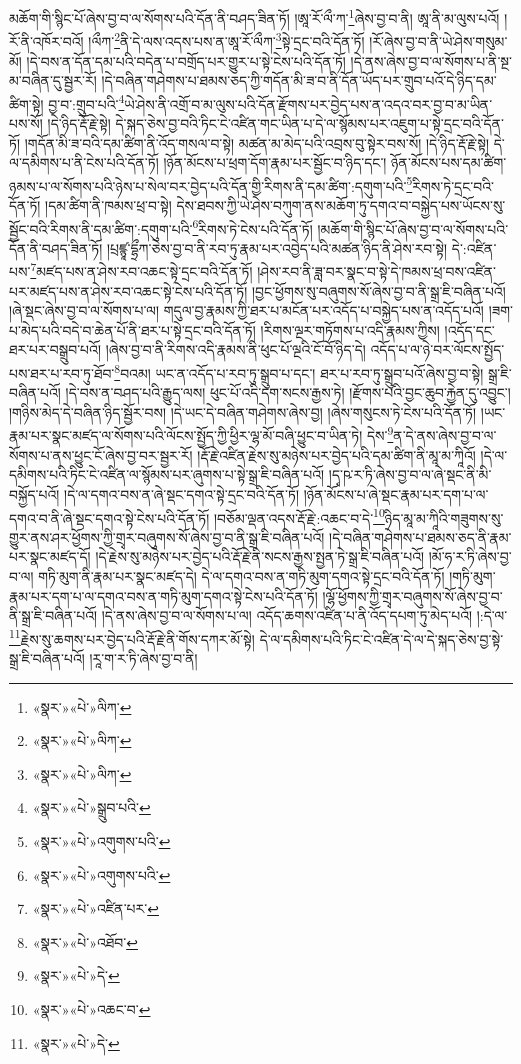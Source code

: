 མཆོག་གི་སྙིང་པོ་ཞེས་བྱ་བ་ལ་སོགས་པའི་དོན་ནི་བཤད་ཟིན་ཏོ། །ཨཱ་རོ་ལྀ་ཀ་\footnote{«སྣར་»«པེ་»ལིཀ་}ཞེས་བྱ་བ་ནི། ཨཱ་ནི་མ་ལུས་པའོ། །རོ་ནི་འཁོར་བའོ། །ལྀཀ་\footnote{«སྣར་»«པེ་»ལིཀ་}ནི་དེ་ལས་འདས་པས་ན་ཨཱ་རོ་ལྀཀ་\footnote{«སྣར་»«པེ་»ལིཀ་}སྟེ་དྲང་བའི་དོན་ཏོ། །རོ་ཞེས་བྱ་བ་ནི་ཡེ་ཤེས་གསུམ་མོ། །དེ་བས་ན་དོན་དམ་པའི་བདེན་པ་བགྲོད་པར་གྱུར་པ་སྟེ་ངེས་པའི་དོན་ཏོ། །དེ་ནས་ཞེས་བྱ་བ་ལ་སོགས་པ་ནི་སྔ་མ་བཞིན་དུ་སྦྱར་རོ། །དེ་བཞིན་གཤེགས་པ་ཐམས་ཅད་ཀྱི་གདོན་མི་ཟ་བ་ནི་དོན་ཡོད་པར་གྲུབ་པའོ་དེ་ཉིད་དམ་ཚིག་སྟེ། བྱ་བ་:གྲུབ་པའི་\footnote{«སྣར་»«པེ་»སྒྲུབ་པའི་}ཡེ་ཤེས་ནི་འགྲོ་བ་མ་ལུས་པའི་དོན་རྫོགས་པར་བྱེད་པས་ན་འདའ་བར་བྱ་བ་མ་ཡིན་པས་སོ། །དེ་ཉིད་རྡོ་རྗེ་སྟེ། དེ་སྐད་ཅེས་བྱ་བའི་ཏིང་ངེ་འཛིན་གང་ཡིན་པ་དེ་ལ་སྙོམས་པར་འཇུག་པ་སྟེ་དྲང་བའི་དོན་ཏོ། །གདོན་མི་ཟ་བའི་དམ་ཚིག་ནི་འོད་གསལ་བ་སྟེ། མཚན་མ་མེད་པའི་འབྲས་བུ་སྟེར་བས་སོ། །དེ་ཉིད་རྡོ་རྗེ་སྟེ། དེ་ལ་དམིགས་པ་ནི་ངེས་པའི་དོན་ཏོ། །ཉོན་མོངས་པ་ཕྲག་དོག་རྣམ་པར་སྦྱོང་བ་ཉིད་དང་། ཉོན་མོངས་པས་དམ་ཚིག་ཉམས་པ་ལ་སོགས་པའི་ཉེས་པ་སེལ་བར་བྱེད་པའི་དོན་གྱི་རིགས་ནི་དམ་ཚིག་:དགུག་པའི་\footnote{«སྣར་»«པེ་»འགུགས་པའི་}རིགས་ཏེ་དྲང་བའི་དོན་ཏོ། །དམ་ཚིག་ནི་ཁམས་ཕྲ་བ་སྟེ། དེས་ཐབས་ཀྱི་ཡེ་ཤེས་བཀུག་ནས་མཆོག་ཏུ་དགའ་བ་བསྐྱེད་པས་ཡོངས་སུ་སྦྱོང་བའི་རིགས་ནི་དམ་ཚིག་:དགུག་པའི་\footnote{«སྣར་»«པེ་»འགུགས་པའི་}རིགས་ཏེ་ངེས་པའི་དོན་ཏོ། །མཆོག་གི་སྙིང་པོ་ཞེས་བྱ་བ་ལ་སོགས་པའི་དོན་ནི་བཤད་ཟིན་ཏོ། །པྲཛྙཱ་དྷྲྀཀ་ཅེས་བྱ་བ་ནི་རབ་ཏུ་རྣམ་པར་འབྱེད་པའི་མཚན་ཉིད་ནི་ཤེས་རབ་སྟེ། དེ་:འཛིན་པས་\footnote{«སྣར་»«པེ་»འཛིན་པར་}མཛད་པས་ན་ཤེས་རབ་འཆང་སྟེ་དྲང་བའི་དོན་ཏོ། །ཤེས་རབ་ནི་ཟླ་བར་སྣང་བ་སྟེ་དེ་ཁམས་ཕྲ་བས་འཛིན་པར་མཛད་པས་ན་ཤེས་རབ་འཆང་སྟེ་ངེས་པའི་དོན་ཏོ། །བྱང་ཕྱོགས་སུ་བཞུགས་སོ་ཞེས་བྱ་བ་ནི་སྒྲ་ཇི་བཞིན་པའོ། །ཞེ་སྡང་ཞེས་བྱ་བ་ལ་སོགས་པ་ལ། གདུལ་བྱ་རྣམས་ཀྱི་ཐར་པ་མངོན་པར་འདོད་པ་བསྐྱེད་པས་ན་འདོད་པའོ། །ཟག་པ་མེད་པའི་བདེ་བ་ཆེན་པོ་ནི་ཐར་པ་སྟེ་དྲང་བའི་དོན་ཏོ། །རིགས་ལྔར་གཏོགས་པ་འདི་རྣམས་ཀྱིས། །འདོད་དང་ཐར་པར་བསྒྲུབ་པའོ། །ཞེས་བྱ་བ་ནི་རིགས་འདི་རྣམས་ནི་ཕུང་པོ་ལྔའི་ངོ་བོ་ཉིད་དེ། འདོད་པ་ལ་ཉེ་བར་ལོངས་སྤྱོད་པས་ཐར་པ་རབ་ཏུ་ཐོབ་\footnote{«སྣར་»«པེ་»འཐོབ་}བའམ། ཡང་ན་འདོད་པ་རབ་ཏུ་སྒྲུབ་པ་དང་། ཐར་པ་རབ་ཏུ་སྒྲུབ་པའོ་ཞེས་བྱ་བ་སྟེ། སྒྲ་ཇི་བཞིན་པའོ། །དེ་བས་ན་བཤད་པའི་རྒྱུད་ལས། ཕུང་པོ་འདི་དག་སངས་རྒྱས་ཏེ། །རྫོགས་པའི་བྱང་ཆུབ་རྐྱེན་དུ་འབྱུང་། །གཉིས་མེད་དེ་བཞིན་ཉིད་སྦྱོར་བས། །དེ་ཡང་དེ་བཞིན་གཤེགས་ཞེས་བྱ། །ཞེས་གསུངས་ཏེ་ངེས་པའི་དོན་ཏོ། །ཡང་རྣམ་པར་སྣང་མཛད་ལ་སོགས་པའི་ལོངས་སྤྱོད་ཀྱི་ཕྱིར་ལྷ་མོ་བཞི་ཕྱུང་བ་ཡིན་ཏེ། དེས་\footnote{«སྣར་»«པེ་»དེ་}ན་དེ་ནས་ཞེས་བྱ་བ་ལ་སོགས་པ་ནས་ཕྱུང་ངོ་ཞེས་བྱ་བར་སྦྱར་རོ། །རྡོ་རྗེ་འཛིན་རྗེས་སུ་མཉེས་པར་བྱེད་པའི་དམ་ཚིག་ནི་མཱ་མ་ཀཱིའོ། །དེ་ལ་དམིགས་པའི་ཏིང་ངེ་འཛིན་ལ་སྙོམས་པར་ཞུགས་པ་སྟེ་སྒྲ་ཇི་བཞིན་པའོ། །དྭ་ཥ་ར་ཏི་ཞེས་བྱ་བ་ལ་ཞེ་སྡང་ནི་མི་བསྐྱོད་པའོ། །དེ་ལ་དགའ་བས་ན་ཞེ་སྡང་དགའ་སྟེ་དྲང་བའི་དོན་ཏོ། །ཉོན་མོངས་པ་ཞེ་སྡང་རྣམ་པར་དག་པ་ལ་དགའ་བ་ནི་ཞེ་སྡང་དགའ་སྟེ་ངེས་པའི་དོན་ཏོ། །བཅོམ་ལྡན་འདས་རྡོ་རྗེ་:འཆང་བ་དེ་\footnote{«སྣར་»«པེ་»འཆང་བ་}ཉིད་མཱ་མ་ཀཱིའི་གཟུགས་སུ་གྱུར་ནས་ཤར་ཕྱོགས་ཀྱི་གྲྭར་བཞུགས་སོ་ཞེས་བྱ་བ་ནི་སྒྲ་ཇི་བཞིན་པའོ། །དེ་བཞིན་གཤེགས་པ་ཐམས་ཅད་ནི་རྣམ་པར་སྣང་མཛད་དོ། །དེ་རྗེས་སུ་མཉེས་པར་བྱེད་པའི་རྡོ་རྗེ་ནི་སངས་རྒྱས་སྤྱན་ཏེ་སྒྲ་ཇི་བཞིན་པའོ། །མོ་ཧ་ར་ཏི་ཞེས་བྱ་བ་ལ། གཏི་མུག་ནི་རྣམ་པར་སྣང་མཛད་དེ། དེ་ལ་དགའ་བས་ན་གཏི་མུག་དགའ་སྟེ་དྲང་བའི་དོན་ཏོ། །གཏི་མུག་རྣམ་པར་དག་པ་ལ་དགའ་བས་ན་གཏི་མུག་དགའ་སྟེ་ངེས་པའི་དོན་ཏོ། །ལྷོ་ཕྱོགས་ཀྱི་གྲྭར་བཞུགས་སོ་ཞེས་བྱ་བ་ནི་སྒྲ་ཇི་བཞིན་པའོ། །དེ་ནས་ཞེས་བྱ་བ་ལ་སོགས་པ་ལ། འདོད་ཆགས་འཛིན་པ་ནི་འོད་དཔག་ཏུ་མེད་པའོ། །:དེ་ལ་\footnote{«སྣར་»«པེ་»དེ་}རྗེས་སུ་ཆགས་པར་བྱེད་པའི་རྡོ་རྗེ་ནི་གོས་དཀར་མོ་སྟེ། དེ་ལ་དམིགས་པའི་ཏིང་ངེ་འཛིན་དེ་ལ་དེ་སྐད་ཅེས་བྱ་སྟེ་སྒྲ་ཇི་བཞིན་པའོ། །རཱ་ག་ར་ཏི་ཞེས་བྱ་བ་ནི། 